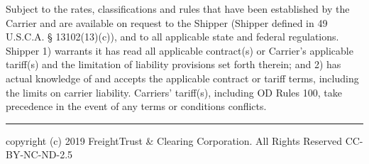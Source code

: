\documentclass[12pt]{article}
\begin{document}
Subject to the rates, classifications and rules that have been
established by the Carrier and are available on request to the Shipper
(Shipper defined in 49 U.S.C.A. § 13102(13)(c)), and to all applicable
state and federal regulations. Shipper 1) warrants it has read all
applicable contract(s) or Carrier's applicable tariff(s) and the
limitation of liability provisions set forth therein; and 2) has actual
knowledge of and accepts the applicable contract or tariff terms,
including the limits on carrier liability. Carriers' tariff(s),
including OD Rules 100, take precedence in the event of any terms or
conditions conflicts.

\begin{center}\rule{0.5\linewidth}{0.5pt}\end{center}

copyright (c) 2019 FreightTrust \& Clearing Corporation. All Rights
Reserved CC-BY-NC-ND-2.5
\end{document}
